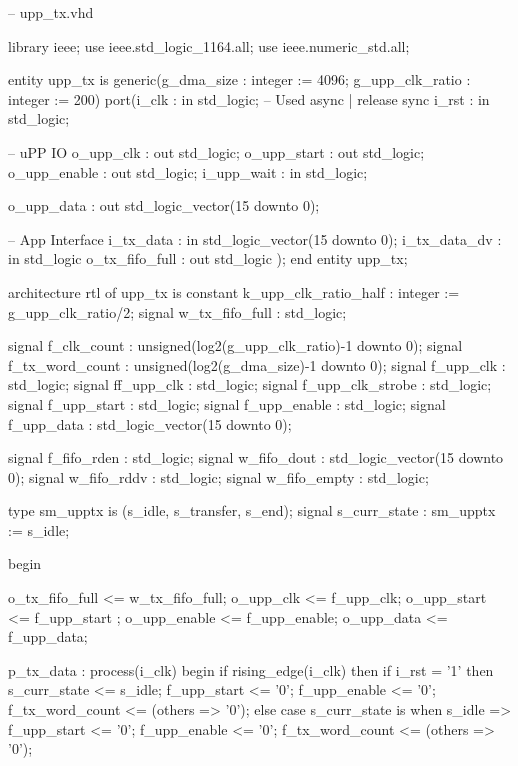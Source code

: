 \begin{VHDLlisting}[tabsize=2]
-- upp_tx.vhd

library ieee;
	use ieee.std_logic_1164.all;
	use ieee.numeric_std.all;
	
entity upp_tx is
	generic(g_dma_size      : integer := 4096;
			g_upp_clk_ratio : integer := 200)
	port(i_clk           : in    std_logic;
		 -- Used async | release sync
	     i_rst           : in    std_logic;
		 
		 -- uPP IO
		 o_upp_clk       :   out std_logic; 
		 o_upp_start     :   out std_logic;
		 o_upp_enable    :   out std_logic;
		 i_upp_wait      : in    std_logic;
		 
		 o_upp_data      :   out std_logic_vector(15 downto 0);
		 
		 -- App Interface
		 i_tx_data       : in    std_logic_vector(15 downto 0);
		 i_tx_data_dv    : in    std_logic	
		 o_tx_fifo_full  :   out std_logic	
	);
end entity upp_tx;

architecture rtl of upp_tx is
	constant k_upp_clk_ratio_half : integer := g_upp_clk_ratio/2;
	signal w_tx_fifo_full : std_logic;
	
	signal f_clk_count      : unsigned(log2(g_upp_clk_ratio)-1 downto 0);
	signal f_tx_word_count  : unsigned(log2(g_dma_size)-1 downto 0);
	signal f_upp_clk        : std_logic;
	signal ff_upp_clk       : std_logic;
	signal f_upp_clk_strobe : std_logic;
	signal f_upp_start      : std_logic;
	signal f_upp_enable     : std_logic;
	signal f_upp_data       : std_logic_vector(15 downto 0);
	                        
	signal f_fifo_rden      : std_logic;
	signal w_fifo_dout      : std_logic_vector(15 downto 0);
	signal w_fifo_rddv      : std_logic;
	signal w_fifo_empty     : std_logic;
	
	type sm_upptx is (s_idle, s_transfer, s_end);
	signal s_curr_state : sm_upptx := s_idle;

begin

	o_tx_fifo_full <= w_tx_fifo_full;
	o_upp_clk      <= f_upp_clk;
	o_upp_start    <= f_upp_start ;
	o_upp_enable   <= f_upp_enable;
	o_upp_data     <= f_upp_data;
	
	p_tx_data : process(i_clk)
	begin
		if rising_edge(i_clk) then
			if i_rst = '1' then
				s_curr_state <= s_idle;
				f_upp_start <= '0';
				f_upp_enable <= '0';
				f_tx_word_count <= (others => '0');
			else
				case s_curr_state is
					when s_idle => 
						f_upp_start <= '0';
						f_upp_enable <= '0';
						f_tx_word_count <= (others => '0');
						

\end{VHDLlisting}
